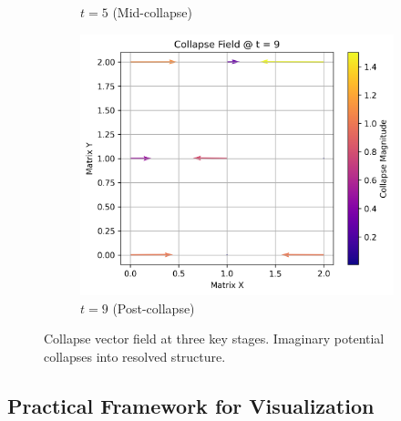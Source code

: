 \begin{figure}[H]
\begin{subfigure}[t]{0.3\textwidth}
      \caption{$t=5$ (Mid-collapse)}
    \end{subfigure}
    \hfill
    \begin{subfigure}[t]{0.3\textwidth}
      \includegraphics[width=\linewidth]{images/collapse_vector_t9.png}
      \caption{$t=9$ (Post-collapse)}
    \end{subfigure}
    \caption{Collapse vector field at three key stages. Imaginary potential collapses into resolved structure.}
    \label{fig:collapse_vector_series}
\end{figure}
  
\subsection*{Practical Framework for Visualization}



